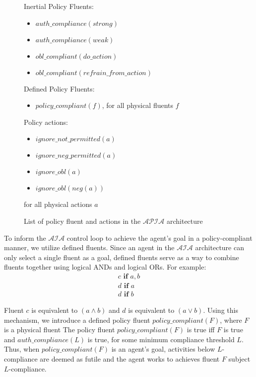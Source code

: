 \begin{figure}[p]
    \begin{framed}
        Inertial Policy Fluents:
        \begin{itemize}
            \item $auth\_compliance(strong)$
            \item $auth\_compliance(weak)$
            \item $obl\_compliant(do\_action)$
            \item $obl\_compliant(refrain\_from\_action)$
        \end{itemize}

        Defined Policy Fluents:
        \begin{itemize}
            \item $policy\_compliant(f)$, for all physical fluents $f$
        \end{itemize}

        Policy actions:
        \begin{itemize}
            \item $ignore\_not\_permitted(a)$
            \item $ignore\_neg\_permitted(a)$
            \item $ignore\_obl(a)$
            \item $ignore\_obl(neg(a))$
        \end{itemize}
        for all physical actions $a$
    \end{framed}
    \caption{List of policy fluent and actions in the $\mathcal{APIA}$ architecture}
    \label{fig:apia_list_policy_fluents_actions}
\end{figure}

To inform the $\mathcal{AIA}$ control loop to achieve the agent's goal in a policy-compliant manner, we utilize defined fluents.
Since an agent in the $\mathcal{AIA}$ architecture can only select a single fluent as a goal, defined fluents serve as a way to combine fluents together using logical ANDs and logical ORs.
For example:
\begin{gather}
    c \textbf{ if } a, b \\
    d \textbf{ if } a \\
    d \textbf{ if } b
\end{gather}

Fluent $c$ is equivalent to $(a \land b)$ and $d$ is equivalent to $(a \lor b)$.
Using this mechanism, we introduce a defined policy fluent $policy\_compliant(F)$, where $F$ is a physical fluent
The policy fluent $policy\_compliant(F)$ is true iff $F$ is true and $auth\_compliance(L)$ is true, for some minimum compliance threshold $L$.
Thus, when $policy\_compliant(F)$ is an agent's goal, activities below $L$-compliance are deemed as futile and the agent works to achieves fluent $F$ subject $L$-compliance.

